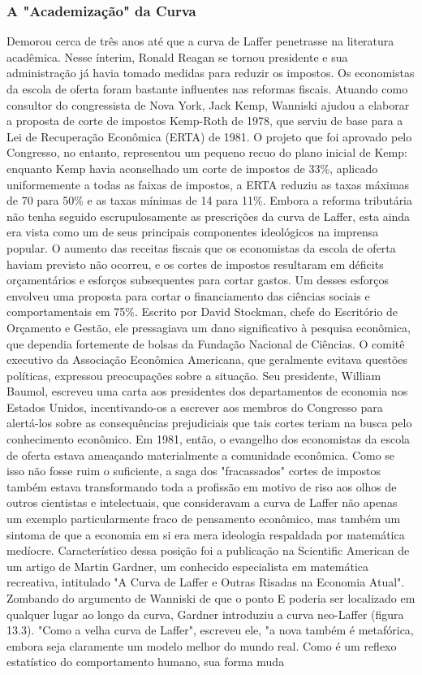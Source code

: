 \documentclass[a4paper,12pt]{article}[abntex2]
\begin{document}
\subsubsection{\textbf{A "Academização" da Curva}}

Demorou cerca de três anos até que a curva de Laffer penetrasse na literatura acadêmica. Nesse ínterim, Ronald Reagan se tornou presidente e sua administração já havia tomado medidas para reduzir os impostos. Os economistas da escola de oferta foram bastante influentes nas reformas fiscais. Atuando como consultor do congressista de Nova York, Jack Kemp, Wanniski ajudou a elaborar a proposta de corte de impostos Kemp-Roth de 1978, que serviu de base para a Lei de Recuperação Econômica (ERTA) de 1981. O projeto que foi aprovado pelo Congresso, no entanto, representou um pequeno recuo do plano inicial de Kemp: enquanto Kemp havia aconselhado um corte de impostos de 33\%, aplicado uniformemente a todas as faixas de impostos, a ERTA reduziu as taxas máximas de 70 para 50\% e as taxas mínimas de 14 para 11\%. Embora a reforma tributária não tenha seguido escrupulosamente as prescrições da curva de Laffer, esta ainda era vista como um de seus principais componentes ideológicos na imprensa popular. O aumento das receitas fiscais que os economistas da escola de oferta haviam previsto não ocorreu, e os cortes de impostos resultaram em déficits orçamentários e esforços subsequentes para cortar gastos. Um desses esforços envolveu uma proposta para cortar o financiamento das ciências sociais e comportamentais em 75\%. Escrito por David Stockman, chefe do Escritório de Orçamento e Gestão, ele pressagiava um dano significativo à pesquisa econômica, que dependia fortemente de bolsas da Fundação Nacional de Ciências. O comitê executivo da Associação Econômica Americana, que geralmente evitava questões políticas, expressou preocupações sobre a situação. Seu presidente, William Baumol, escreveu uma carta aos presidentes dos departamentos de economia nos Estados Unidos, incentivando-os a escrever aos membros do Congresso para alertá-los sobre as consequências prejudiciais que tais cortes teriam na busca pelo conhecimento econômico. Em 1981, então, o evangelho dos economistas da escola de oferta estava ameaçando materialmente a comunidade econômica. Como se isso não fosse ruim o suficiente, a saga dos "fracassados" cortes de impostos também estava transformando toda a profissão em motivo de riso aos olhos de outros cientistas e intelectuais, que consideravam a curva de Laffer não apenas um exemplo particularmente fraco de pensamento econômico, mas também um sintoma de que a economia em si era mera ideologia respaldada por matemática medíocre. Característico dessa posição foi a publicação na Scientific American de um artigo de Martin Gardner, um conhecido especialista em matemática recreativa, intitulado "A Curva de Laffer e Outras Risadas na Economia Atual". Zombando do argumento de Wanniski de que o ponto E poderia ser localizado em qualquer lugar ao longo da curva, Gardner introduziu a curva neo-Laffer (figura 13.3). "Como a velha curva de Laffer", escreveu ele, "a nova também é metafórica, embora seja claramente um modelo melhor do mundo real. Como é um reflexo estatístico do comportamento humano, sua forma muda 
\end{document}
